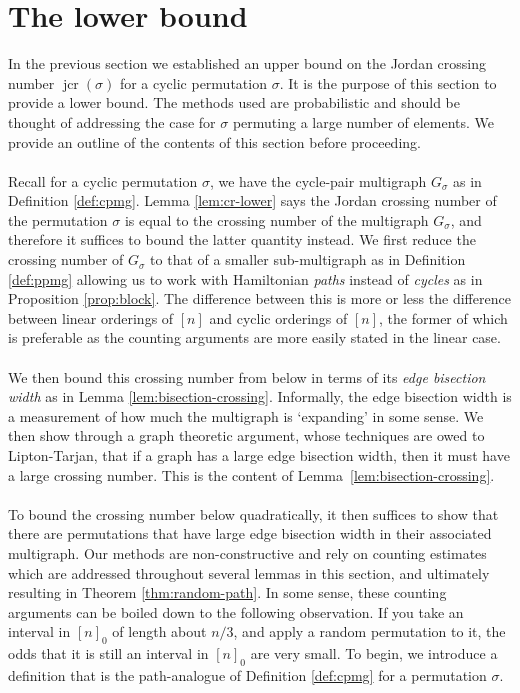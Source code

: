 \documentclass[11pt,a4paper]{amsart}
\theoremstyle{definition}
\theoremstyle{remark}
\DeclareMathOperator{\jcr}{jcr}
\begin{document}
\section{The lower bound}
\label{sec:lower-bound}

In the previous section we established an upper bound on the Jordan crossing number $\jcr(\sigma)$ for a cyclic permutation $\sigma$.  It is the purpose of this section to provide a lower bound.  The methods used are probabilistic and should be thought of addressing the case for $\sigma$ permuting a large number of elements.  We provide an outline of the contents of this section before proceeding.  \\
\\
Recall for a cyclic permutation $\sigma$, we have the cycle-pair multigraph $G_{\sigma}$ as in Definition \ref{def:cpmg}.  Lemma \ref{lem:cr-lower} says the Jordan crossing number of the permutation $\sigma$ is equal to the crossing number of the multigraph $G_{\sigma}$, and therefore it suffices to bound the latter quantity instead.  We first reduce the crossing number of $G_{\sigma}$ to that of a smaller sub-multigraph as in Definition \ref{def:ppmg} allowing us to work with Hamiltonian \emph{paths} instead of \emph{cycles} as in Proposition \ref{prop:block}.  The difference between this is more or less the difference between linear orderings of $[n]$ and cyclic orderings of $[n]$, the former of which is preferable as the counting arguments are more easily stated in the linear case.
\\
\\
We then bound this crossing number from below in terms of its \emph{edge bisection width} as in Lemma \ref{lem:bisection-crossing}.  Informally, the edge bisection width is a measurement of how much the multigraph is `expanding' in some sense.  We then show through a graph theoretic argument, whose techniques are owed to Lipton-Tarjan, that if a graph has a large edge bisection width, then it must have a large crossing number.  This is the content of Lemma~\ref{lem:bisection-crossing}.  \\
\\
To bound the crossing number below quadratically, it then suffices to show that there are permutations that have large edge bisection width in their associated multigraph.  Our methods are non-constructive and rely on counting estimates which are addressed throughout several lemmas in this section, and ultimately resulting in Theorem \ref{thm:random-path}.  In some sense, these counting arguments can be boiled down to the following observation.  If you take an interval in $[n]_{0}$ of length about $n/3$, and apply a random permutation to it, the odds that it is still an interval in $[n]_{0}$ are very small.  To begin, we introduce a definition that is the path-analogue of Definition \ref{def:cpmg} for a permutation $\sigma$.  
\end{document}
